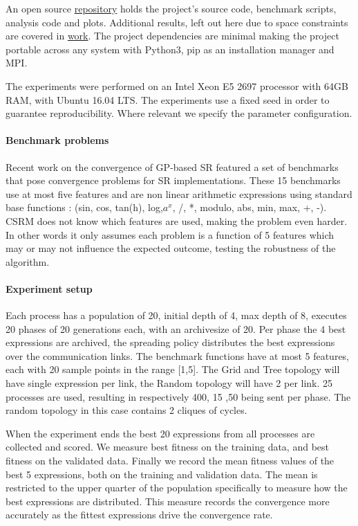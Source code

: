An open source \href{https://bitbucket.org/bcardoen/csrm}{repository} holds the project's source code, benchmark scripts, analysis code and plots. Additional results, left out here due to space constraints are covered in \href{https://bitbucket.org/bcardoen/csrm/src/9de4b990ce27bbaeb885203f82a76635d8d92473/thesis/thesis/MsCThesisBenCardoen.pdf?at=master&fileviewer=file-view-default}{work}. The project dependencies are minimal making the project portable across any system with Python3, pip as an installation manager and MPI.

The experiments were performed on an Intel Xeon E5 2697 processor with 64GB RAM, with Ubuntu 16.04 LTS.  The experiments use a fixed seed in order to guarantee reproducibility. Where relevant we specify the parameter configuration.
 
\paragraph{Benchmark problems}
Recent work on the convergence of GP-based SR \cite{SRAccur, SRBaseline} featured a set of benchmarks that pose convergence problems for SR implementations. 
These 15 benchmarks use at most five features and are non linear arithmetic expressions using standard base functions : (sin, cos, tan(h), log,$a^x$, /, *, modulo, abs, min, max, +, -). CSRM does not know which features are used, making the problem even harder. In other words it only assumes each problem is a function of 5 features which may or may not influence the expected outcome, testing the robustness of the algorithm.

\paragraph{Experiment setup}
Each process has a population of 20, initial depth of 4, max depth of 8, executes 20 phases of 20 generations each, with an archivesize of 20. Per phase the 4 best expressions are archived, the spreading policy distributes the best expressions over the communication links. The benchmark functions have at most 5 features, each with 20 sample points in the range [1,5]. The Grid and Tree topology will have single expression per link, the Random topology will have 2 per link. 25 processes are used, resulting in respectively 400, 15 ,50 being sent per phase. The random topology in this case contains 2 cliques of cycles.

When the experiment ends the best 20 expressions from all processes are collected and scored. We measure best fitness on the training data, and best fitness on the validated data. 
Finally we record the mean fitness values of the best 5 expressions, both on the training and validation data. The mean is restricted to the upper quarter of the population specifically to measure how the best expressions are distributed. This measure records the convergence more accurately as the fittest expressions drive the convergence rate. 

